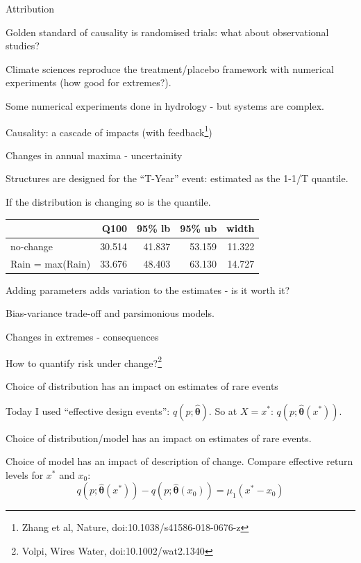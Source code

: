 \documentclass[
  10pt,
  ignorenonframetext,
  compress]{beamer}
\begin{document}
\begin{frame}{Attribution}
\protect\hypertarget{attribution}{}

Golden standard of causality is randomised trials: what about
observational studies?

Climate sciences reproduce the treatment/placebo framework with
numerical experiments (how good for extremes?).

Some numerical experiments done in hydrology - but systems are complex.

Causality: a cascade of impacts (with
feedback\footnote{Zhang et al, Nature, doi:10.1038/s41586-018-0676-z})

\end{frame}

\begin{frame}{Changes in annual maxima - uncertainity}
\protect\hypertarget{changes-in-annual-maxima---uncertainity}{}

Structures are designed for the ``T-Year'' event: estimated as the 1-1/T
quantile.

If the distribution is changing so is the quantile.

\pause

\begin{longtable}[]{@{}lrrrr@{}}
\toprule
& Q100 & 95\% lb & 95\% ub & width\tabularnewline
\midrule
\endhead
no-change & 30.514 & 41.837 & 53.159 & 11.322\tabularnewline
Rain = max(Rain) & 33.676 & 48.403 & 63.130 & 14.727\tabularnewline
\bottomrule
\end{longtable}

Adding parameters adds variation to the estimates - is it worth it?

\pause

Bias-variance trade-off and parsimonious models.

\end{frame}

\begin{frame}{Changes in extremes - consequences}
\protect\hypertarget{changes-in-extremes---consequences}{}

How to quantify risk under
change?\footnote{Volpi, Wires Water, doi:10.1002/wat2.1340}

Choice of distribution has an impact on estimates of rare events

Today I used ``effective design events'':
\(q(p; \hat{\boldsymbol \theta})\). So at \(X=x^{*}\):
\(q(p; \hat{\boldsymbol \theta}(x^{*}))\).

Choice of distribution/model has an impact on estimates of rare events.

Choice of model has an impact of description of change. Compare
effective return levels for \(x^{*}\) and \(x_0\):
\[q(p; \hat{\boldsymbol \theta}(x^{*})) - q(p; \hat{\boldsymbol \theta}(x_0)) = \mu_1 (x^{*}-x_0)\]

\end{frame}
\end{document}
